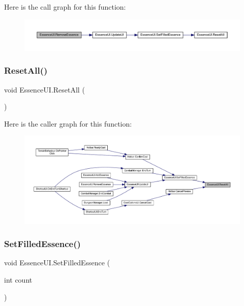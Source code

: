 Here is the call graph for this function\+:
\nopagebreak
\begin{figure}[H]
\begin{center}
\leavevmode
\includegraphics[width=350pt]{class_essence_u_i_a39b3c1ec97a29130e2e8ab4050921ed6_cgraph}
\end{center}
\end{figure}
\mbox{\label{class_essence_u_i_a82a6c20070b4fd052eae20ba6e05487b}} 
\subsubsection{\texorpdfstring{ResetAll()}{ResetAll()}}
{\footnotesize\ttfamily void Essence\+U\+I.\+Reset\+All (\begin{DoxyParamCaption}{ }\end{DoxyParamCaption})}

Here is the caller graph for this function\+:
\nopagebreak
\begin{figure}[H]
\begin{center}
\leavevmode
\includegraphics[width=350pt]{class_essence_u_i_a82a6c20070b4fd052eae20ba6e05487b_icgraph}
\end{center}
\end{figure}
\mbox{\label{class_essence_u_i_aac12f1c82310ceb94e259d9b6aa9bdfd}} 
\subsubsection{\texorpdfstring{SetFilledEssence()}{SetFilledEssence()}}
{\footnotesize\ttfamily void Essence\+U\+I.\+Set\+Filled\+Essence (\begin{DoxyParamCaption}\item[{int}]{count }\end{DoxyParamCaption})}

